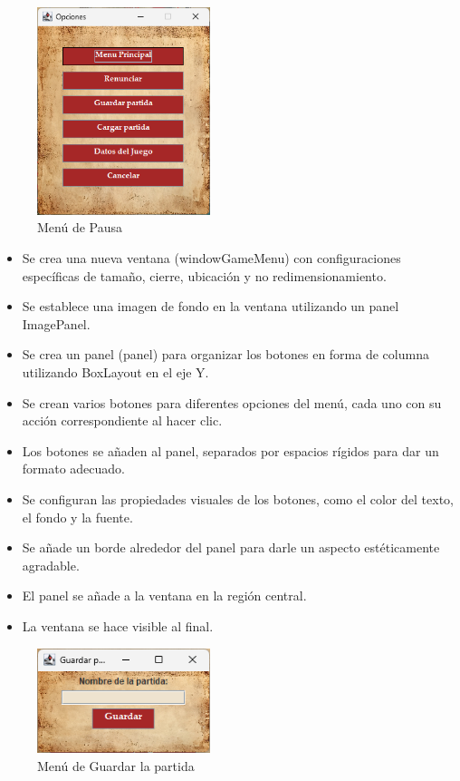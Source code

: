\documentclass{article}
\begin{document}
\newpage
    \begin{figure}[H]
        \centering
		\includegraphics[width=0.45\textwidth,keepaspectratio]{img/Menu_Opciones.png}
        \caption{Menú de Pausa}
    \end{figure}

    \begin{itemize}	
            \item Se crea una nueva ventana (windowGameMenu) con configuraciones específicas de tamaño, cierre, ubicación y no redimensionamiento.
            \item Se establece una imagen de fondo en la ventana utilizando un panel ImagePanel.
            \item Se crea un panel (panel) para organizar los botones en forma de columna utilizando BoxLayout en el eje Y.
            \item Se crean varios botones para diferentes opciones del menú, cada uno con su acción correspondiente al hacer clic.
            \item Los botones se añaden al panel, separados por espacios rígidos para dar un formato adecuado.
            \item Se configuran las propiedades visuales de los botones, como el color del texto, el fondo y la fuente.
            \item Se añade un borde alrededor del panel para darle un aspecto estéticamente agradable.
            \item El panel se añade a la ventana en la región central.
            \item La ventana se hace visible al final.
	\end{itemize}



\newpage
    \begin{figure}[H]
        \centering
		\includegraphics[width=0.45\textwidth,keepaspectratio]{img/Menu_Guardar_Partida.png}
        \caption{Menú de Guardar la partida}
    \end{figure}
\end{document}
